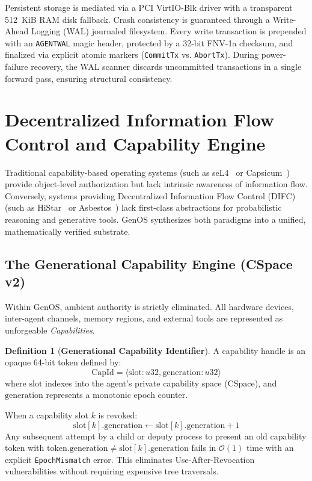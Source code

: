 \documentclass[10pt,journal,compsoc]{IEEEtran}
\theoremstyle{definition}
\newtheorem{definition}{Definition}
\begin{document}
Persistent storage is mediated via a PCI VirtIO-Blk driver with a transparent 512~KiB RAM disk fallback. Crash consistency is guaranteed through a Write-Ahead Logging (WAL) journaled filesystem. Every write transaction is prepended with an \texttt{AGENTWAL} magic header, protected by a 32-bit FNV-1a checksum, and finalized via explicit atomic markers (\texttt{CommitTx} vs. \texttt{AbortTx}). During power-failure recovery, the WAL scanner discards uncommitted transactions in a single forward pass, ensuring structural consistency.

\section{Decentralized Information Flow Control and Capability Engine}
\label{sec:difc}

Traditional capability-based operating systems (such as seL4~\cite{klein2009sel4} or Capsicum~\cite{watson2010capsicum}) provide object-level authorization but lack intrinsic awareness of information flow. Conversely, systems providing Decentralized Information Flow Control (DIFC) (such as HiStar~\cite{zeldovich2006making} or Asbestos~\cite{efstathopoulos2005labels}) lack first-class abstractions for probabilistic reasoning and generative tools. GenOS synthesizes both paradigms into a unified, mathematically verified substrate.

\subsection{The Generational Capability Engine (CSpace v2)}
Within GenOS, ambient authority is strictly eliminated. All hardware devices, inter-agent channels, memory regions, and external tools are represented as unforgeable \textit{Capabilities}.

\begin{definition}[\textbf{Generational Capability Identifier}]
A capability handle is an opaque 64-bit token defined by:
$$\text{CapId} = \langle \text{slot}: u32, \text{generation}: u32 \rangle$$
where $\text{slot}$ indexes into the agent's private capability space ($\text{CSpace}$), and $\text{generation}$ represents a monotonic epoch counter.
\end{definition}

When a capability slot $k$ is revoked:
$$\text{slot}[k].\text{generation} \leftarrow \text{slot}[k].\text{generation} + 1$$
Any subsequent attempt by a child or deputy process to present an old capability token with $\text{token}.\text{generation} \neq \text{slot}[k].\text{generation}$ fails in $\mathcal{O}(1)$ time with an explicit \texttt{EpochMismatch} error. This eliminates Use-After-Revocation vulnerabilities without requiring expensive tree traversals.
\end{document}
